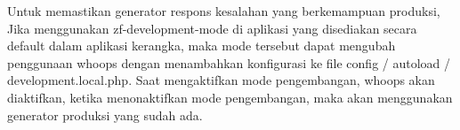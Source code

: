 Untuk memastikan  generator respons kesalahan yang berkemampuan produksi, Jika menggunakan zf-development-mode di aplikasi yang disediakan secara default dalam aplikasi kerangka, maka mode tersebut dapat mengubah penggunaan whoops dengan menambahkan konfigurasi ke file config / autoload / development.local.php. Saat mengaktifkan mode pengembangan, whoops akan diaktifkan, ketika menonaktifkan mode pengembangan, maka akan menggunakan generator produksi yang sudah ada.
